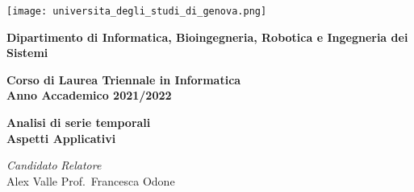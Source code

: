 \begin{titlepage}
    \begin{center}

        \texttt{[image: universita\_degli\_studi\_di\_genova.png]}
        
        \vspace*{0.5cm}

        \textbf{Dipartimento di Informatica, Bioingegneria, Robotica e Ingegneria dei Sistemi}

        \vspace*{0.5cm}

        \textbf{Corso di Laurea Triennale in Informatica}\\
        \textbf{Anno Accademico 2021/2022}

        \vspace*{2cm}
        
        \LARGE
        \textbf{Analisi di serie temporali\\\large Aspetti Applicativi}

        \vspace*{4cm}

        \normalsize

        \textit{Candidato}
        \hfill
        \textit{Relatore}\\

        Alex Valle
        \hfill
        Prof.\ Francesca Odone\\

    \end{center}
\end{titlepage}

\afterpage{\blankpage}
